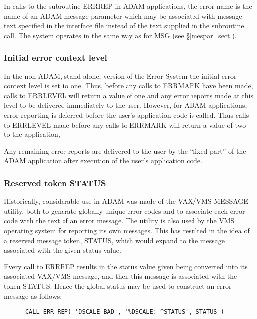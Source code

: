 \documentclass[twoside,11pt]{article}
\newcommand{\htmlref}[2]{#1}
\newcommand{\latex}[1]{#1}
\newcommand{\xlabel}[1]{}
\renewcommand{\_}{\texttt{\symbol{95}}}
\begin{document}
In calls to the subroutine ERR\_REP in ADAM applications, the error name is the
name of an ADAM message parameter which may be associated with message text
specified in the interface file instead of the text supplied in the subroutine
call.
The system operates in the same way as for
\htmlref{MSG}{mespar_sect}\latex{ (see \S\ref{mespar_sect})}.

\subsubsection{\xlabel{initial_error_context_level}Initial error context level}
In the non-ADAM, stand-alone, version of the Error System the initial error
context level is set to one.
Thus, before any calls to ERR\_MARK have been made, calls to ERR\_LEVEL will 
return a value of one and any error reports made at this level to be delivered
immediately to the user.
However, for ADAM applications, error reporting is deferred before
the user's application code is called.
Thus calls to ERR\_LEVEL made before any calls to ERR\_MARK will return a 
value of two to the application,

Any remaining error reports are delivered to the user by the ``fixed-part''
of the ADAM application after execution of
the user's application code.


\subsubsection{\xlabel{reserved_token_status}Reserved token STATUS \label{restok}}
Historically, considerable use in ADAM was made of the VAX/VMS MESSAGE utility, 
both to generate globally unique error codes and to associate each error code 
with the text of an error message.
The utility is also used by the VMS operating system for reporting 
its own messages.
This has resulted in the idea of
a reserved message token, STATUS, which would expand to the message associated
with the given status value.

Every call to ERR\_REP results in the status value given being converted into
its associated VAX/VMS message, and then this message is associated with the 
token STATUS.
Hence the global status may be used to construct an error message as follows:

\begin {small}
\begin{verbatim}
      CALL ERR_REP( 'DSCALE_BAD', '%DSCALE: ^STATUS', STATUS )
\end{verbatim}
\end {small}
\end{document}
